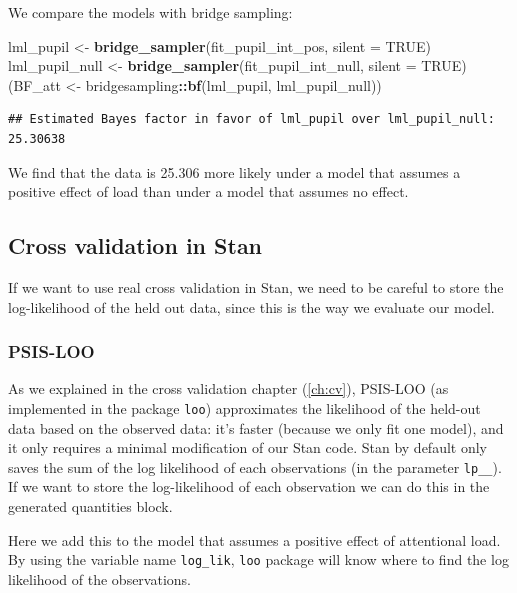\documentclass[12pt,]{krantz}
\newenvironment{Shaded}{\begin{snugshade}}{\end{snugshade}}
\newcommand{\DataTypeTok}[1]{\textcolor[rgb]{0.13,0.29,0.53}{#1}}
\newcommand{\KeywordTok}[1]{\textcolor[rgb]{0.13,0.29,0.53}{\textbf{#1}}}
\newcommand{\NormalTok}[1]{#1}
\newcommand{\OperatorTok}[1]{\textcolor[rgb]{0.81,0.36,0.00}{\textbf{#1}}}
\newcommand{\OtherTok}[1]{\textcolor[rgb]{0.56,0.35,0.01}{#1}}
\newcommand{\StringTok}[1]{\textcolor[rgb]{0.31,0.60,0.02}{#1}}
\theoremstyle{definition}
\theoremstyle{definition}
\theoremstyle{definition}
\theoremstyle{remark}
\begin{document}
We compare the models with bridge sampling:

\begin{Shaded}
\begin{Highlighting}[]
\NormalTok{lml_pupil <-}\StringTok{ }\KeywordTok{bridge_sampler}\NormalTok{(fit_pupil_int_pos, }\DataTypeTok{silent =} \OtherTok{TRUE}\NormalTok{)}
\NormalTok{lml_pupil_null <-}\StringTok{ }\KeywordTok{bridge_sampler}\NormalTok{(fit_pupil_int_null, }\DataTypeTok{silent =} \OtherTok{TRUE}\NormalTok{)}
\NormalTok{(BF_att <-}\StringTok{ }\NormalTok{bridgesampling}\OperatorTok{::}\KeywordTok{bf}\NormalTok{(lml_pupil, lml_pupil_null))}
\end{Highlighting}
\end{Shaded}

\begin{verbatim}
## Estimated Bayes factor in favor of lml_pupil over lml_pupil_null: 25.30638
\end{verbatim}

We find that the data is 25.306 more likely under a model that assumes a positive effect of load than under a model that assumes no effect.

\hypertarget{cross-validation-in-stan}{%
\subsection{Cross validation in Stan}\label{cross-validation-in-stan}}

If we want to use real cross validation in Stan, we need to be careful to store the log-likelihood of the held out data, since this is the way we evaluate our model.

\hypertarget{psis-loo}{%
\subsubsection{PSIS-LOO}\label{psis-loo}}

As we explained in the cross validation chapter (\ref{ch:cv}), PSIS-LOO (as implemented in the package \texttt{loo}) approximates the likelihood of the held-out data based on the observed data: it's faster (because we only fit one model), and it only requires a minimal modification of our Stan code. Stan by default only saves the sum of the log likelihood of each observations (in the parameter \texttt{lp\_\_}). If we want to store the log-likelihood of each observation we can do this in the generated quantities block.

Here we add this to the model that assumes a positive effect of attentional load. By using the variable name \texttt{log\_lik}, \texttt{loo} package will know where to find the log likelihood of the observations.
\end{document}
